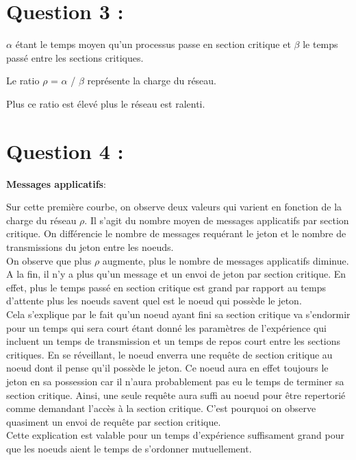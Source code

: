 \documentclass[11pt,a4paper]{report}
\begin{document}
\section{Question 3 :}

$\alpha$ étant le temps moyen qu'un processus passe en section critique et $\beta$ le temps passé entre les sections critiques.

Le ratio $\rho$ = $\alpha$ / $\beta$ représente la charge du réseau.

Plus ce ratio est élevé plus le réseau est ralenti.

\section{Question 4 :}

\textbf{Messages applicatifs}:

Sur cette première courbe, on observe deux valeurs qui varient en fonction de la charge du réseau $\rho$. Il s'agit du nombre moyen de messages applicatifs par section critique. On différencie le nombre de messages requérant le jeton et le nombre de transmissions du jeton entre les noeuds.\\

On observe que plus $\rho$ augmente, plus le nombre de messages applicatifs diminue. A la fin, il n'y a plus qu'un message et un envoi de jeton par section critique. En effet, plus le temps passé en section critique est grand par rapport au temps d'attente plus les noeuds savent quel est le noeud qui possède le jeton.\\

Cela s'explique par le fait qu'un noeud ayant fini sa section critique va s'endormir pour un temps qui sera court étant donné les paramètres de l'expérience qui incluent un temps de transmission et un temps de repos court entre les sections critiques. En se réveillant, le noeud enverra une requête de section critique au noeud dont il pense qu'il possède le jeton. Ce noeud aura en effet toujours le jeton en sa possession car il n'aura probablement pas eu le temps de terminer sa section critique. Ainsi, une seule requête aura suffi au noeud pour être repertorié comme demandant l'accès à la section critique. C'est pourquoi on observe quasiment un envoi de requête par section critique.\\

Cette explication est valable pour un temps d'expérience suffisament grand pour que les noeuds aient le temps de s'ordonner mutuellement.\\
\end{document}

